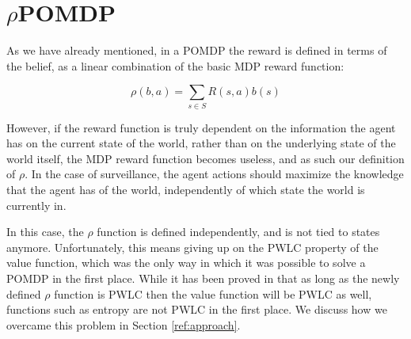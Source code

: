 %
%
%
%

\section{$\rho$POMDP}

As we have already mentioned, in a POMDP the reward is defined in terms of the belief, as a linear
combination of the basic MDP reward function: 

\[ \rho(b,a) = \sum_{s\in S} R(s,a) b(s) \]

However, if the reward function is truly  dependent on the information the agent has on the current
state of the world, rather than on the underlying state of the world itself, the MDP reward function
becomes useless, and as such our definition of $\rho$. In the case of surveillance, the agent
actions should maximize the knowledge that the agent has of the world, independently of which state
the world is currently in.

In this case, the $\rho$ function is defined independently, and is not tied to states anymore.
Unfortunately, this means giving up on the PWLC property of the value function, which was the only
way in which it was possible to solve a POMDP in the first place. While it has been proved in
\cite{cit:rpomdp} that as long as the newly defined $\rho$ function is PWLC then the value function
will be PWLC as well, functions such as entropy are not PWLC in the first place. We discuss how we
overcame this problem in Section \ref{ref:approach}.
